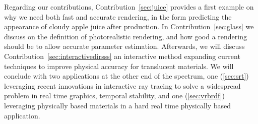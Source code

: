 Regarding our contributions, Contribution~\ref{sec:juice} provides a first example on why we need both fast and accurate rendering, in the form predicting the appearance of  cloudy apple juice after production. In Contribution~\ref{sec:glass} we discuss on the definition of photorealistic rendering, and how good a rendering should be to allow accurate parameter estimation. Afterwards, we will discuss Contribution~\ref{sec:interactivedirsss} an interactive method expanding current techniques to improve physical accuracy for translucent materials. We will conclude with two applications at the other end of the spectrum, one (\ref{sec:srt}) leveraging recent innovations in interactive ray tracing to solve a widespread problem in real time graphics, temporal stability, and one (\ref{sec:vrbrdf}) leveraging physically based materials in a hard real time physically based application. 

